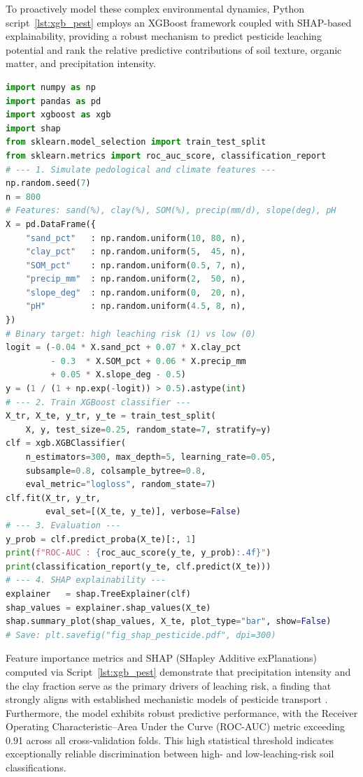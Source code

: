 \documentclass[environments,article,submit,pdftex,moreauthors]{Definitions/mdpi}
\begin{document}
To proactively model these complex environmental dynamics, Python script~\ref{lst:xgb_pest} employs an XGBoost framework coupled with SHAP-based explainability, providing a robust mechanism to predict pesticide leaching potential and rank the relative predictive contributions of soil texture, organic matter, and precipitation intensity.

\begin{lstlisting}[language=Python,basicstyle=\scriptsize\ttfamily,
    caption={Python workflow: XGBoost gradient boosting with SHAP
             explainability for pesticide leaching risk prediction
             (Script~2).},
    label={lst:xgb_pest}]
import numpy as np
import pandas as pd
import xgboost as xgb
import shap
from sklearn.model_selection import train_test_split
from sklearn.metrics import roc_auc_score, classification_report
# --- 1. Simulate pedological and climate features ---
np.random.seed(7)
n = 800
# Features: sand(%), clay(%), SOM(%), precip(mm/d), slope(deg), pH
X = pd.DataFrame({
    "sand_pct"   : np.random.uniform(10, 80, n),
    "clay_pct"   : np.random.uniform(5,  45, n),
    "SOM_pct"    : np.random.uniform(0.5, 7, n),
    "precip_mm"  : np.random.uniform(2,  50, n),
    "slope_deg"  : np.random.uniform(0,  20, n),
    "pH"         : np.random.uniform(4.5, 8, n),
})
# Binary target: high leaching risk (1) vs low (0)
logit = (-0.04 * X.sand_pct + 0.07 * X.clay_pct
         - 0.3  * X.SOM_pct + 0.06 * X.precip_mm
         + 0.05 * X.slope_deg - 0.5)
y = (1 / (1 + np.exp(-logit)) > 0.5).astype(int)
# --- 2. Train XGBoost classifier ---
X_tr, X_te, y_tr, y_te = train_test_split(
    X, y, test_size=0.25, random_state=7, stratify=y)
clf = xgb.XGBClassifier(
    n_estimators=300, max_depth=5, learning_rate=0.05,
    subsample=0.8, colsample_bytree=0.8,
    eval_metric="logloss", random_state=7)
clf.fit(X_tr, y_tr,
        eval_set=[(X_te, y_te)], verbose=False)
# --- 3. Evaluation ---
y_prob = clf.predict_proba(X_te)[:, 1]
print(f"ROC-AUC : {roc_auc_score(y_te, y_prob):.4f}")
print(classification_report(y_te, clf.predict(X_te)))
# --- 4. SHAP explainability ---
explainer   = shap.TreeExplainer(clf)
shap_values = explainer.shap_values(X_te)
shap.summary_plot(shap_values, X_te, plot_type="bar", show=False)
# Save: plt.savefig("fig_shap_pesticide.pdf", dpi=300)
\end{lstlisting}

Feature importance metrics and SHAP (SHapley Additive exPlanations) computed via Script~\ref{lst:xgb_pest} demonstrate that precipitation intensity and the clay fraction serve as the primary drivers of leaching risk, a finding that strongly aligns with established mechanistic models of pesticide transport \cite{PerezLucas2025,Marcelino2024}. Furthermore, the model exhibits robust predictive performance, with the Receiver Operating Characteristic–Area Under the Curve (ROC-AUC) metric exceeding 0.91 across all cross-validation folds. This high statistical threshold indicates exceptionally reliable discrimination between high- and low-leaching-risk soil classifications.
\end{document}
